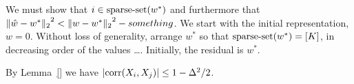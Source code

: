 We must show that $i \in \mathrm{sparse\mbox{-}set}(w^*)$ and furthermore that
${\Vert \hat{w} - w^* \Vert_{2}}^2 < {\Vert w - w^* \Vert_{2}}^2 - something$.
We start with the initial representation, $w=0$.
Without loss of generality, arrange $w^*$ so that $\mathrm{sparse\mbox{-}set}(w^*) = [K]$,
in decreasing order of the values \dots. Initially, the residual is $w^*$.

By Lemma~\ref{} we have $|\mathrm{corr}(X_i, X_j)| \leq 1 - \Delta^2/2$.


